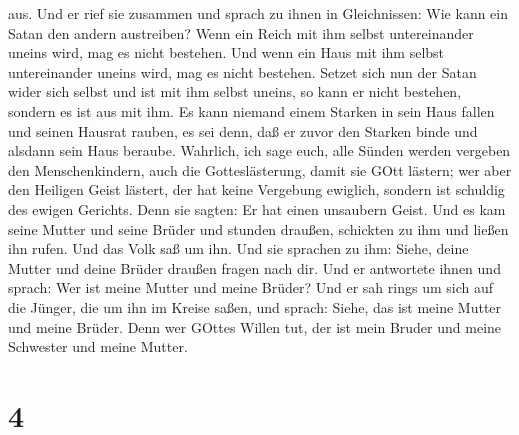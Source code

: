 aus.  Und er rief sie zusammen und sprach zu ihnen in
Gleichnissen: Wie kann ein Satan den andern austreiben? 
Wenn ein Reich mit ihm selbst untereinander uneins wird, mag es nicht
bestehen.  Und wenn ein Haus mit ihm selbst untereinander
uneins wird, mag es nicht bestehen.  Setzet sich nun der
Satan wider sich selbst und ist mit ihm selbst uneins, so kann er nicht
bestehen, sondern es ist aus mit ihm.  Es kann niemand
einem Starken in sein Haus fallen und seinen Hausrat rauben, es sei
denn, daß er zuvor den Starken binde und alsdann sein Haus beraube.
 Wahrlich, ich sage euch, alle Sünden werden vergeben den
Menschenkindern, auch die Gotteslästerung, damit sie GOtt lästern;
 wer aber den Heiligen Geist lästert, der hat keine
Vergebung ewiglich, sondern ist schuldig des ewigen Gerichts.
 Denn sie sagten: Er hat einen unsaubern Geist.
 Und es kam seine Mutter und seine Brüder und stunden
draußen, schickten zu ihm und ließen ihn rufen.  Und das
Volk saß um ihn. Und sie sprachen zu ihm: Siehe, deine Mutter und deine
Brüder draußen fragen nach dir.  Und er antwortete ihnen
und sprach: Wer ist meine Mutter und meine Brüder?  Und er
sah rings um sich auf die Jünger, die um ihn im Kreise saßen, und
sprach: Siehe, das ist meine Mutter und meine Brüder.  Denn
wer GOttes Willen tut, der ist mein Bruder und meine Schwester und meine
Mutter.

\hypertarget{section-3}{%
\section{4}\label{section-3}}

